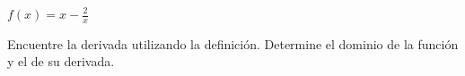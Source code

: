 \item $f(x) = x - \frac{2}{x}$
\par
Encuentre la derivada utilizando la definición. Determine el dominio de la función y el de su derivada.
